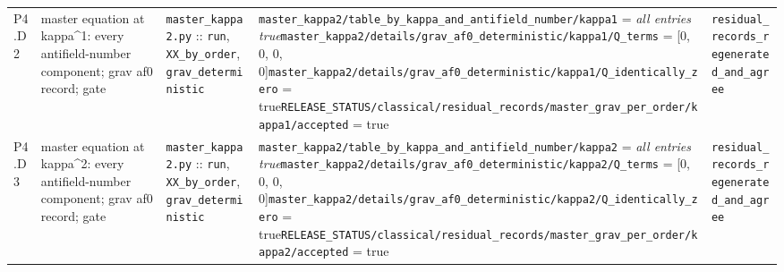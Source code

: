 {\begin{longtable}{@{}p{0.9cm}p{4.1cm}p{3.5cm}p{5.0cm}p{3.0cm}@{}}
P4.D2 & master equation at kappa\^{}1: every antifield-number component; grav af0 record; gate & \texttt{master\_\allowbreak{}kappa2.\allowbreak{}py} :: \texttt{run}, \texttt{XX\_\allowbreak{}by\_\allowbreak{}order}, \texttt{grav\_\allowbreak{}deterministic} & \texttt{master\_\allowbreak{}kappa2/\allowbreak{}table\_\allowbreak{}by\_\allowbreak{}kappa\_\allowbreak{}and\_\allowbreak{}antifield\_\allowbreak{}number/\allowbreak{}kappa1} = \emph{all entries true}\newline \texttt{master\_\allowbreak{}kappa2/\allowbreak{}details/\allowbreak{}grav\_\allowbreak{}af0\_\allowbreak{}deterministic/\allowbreak{}kappa1/\allowbreak{}Q\_\allowbreak{}terms} = [0, 0, 0, 0]\newline \texttt{master\_\allowbreak{}kappa2/\allowbreak{}details/\allowbreak{}grav\_\allowbreak{}af0\_\allowbreak{}deterministic/\allowbreak{}kappa1/\allowbreak{}Q\_\allowbreak{}identically\_\allowbreak{}zero} = true\newline \texttt{RELEASE\_\allowbreak{}STATUS/\allowbreak{}classical/\allowbreak{}residual\_\allowbreak{}records/\allowbreak{}master\_\allowbreak{}grav\_\allowbreak{}per\_\allowbreak{}order/\allowbreak{}kappa1/\allowbreak{}accepted} = true & \texttt{residual\_\allowbreak{}records\_\allowbreak{}regenerated\_\allowbreak{}and\_\allowbreak{}agree} \\
P4.D3 & master equation at kappa\^{}2: every antifield-number component; grav af0 record; gate & \texttt{master\_\allowbreak{}kappa2.\allowbreak{}py} :: \texttt{run}, \texttt{XX\_\allowbreak{}by\_\allowbreak{}order}, \texttt{grav\_\allowbreak{}deterministic} & \texttt{master\_\allowbreak{}kappa2/\allowbreak{}table\_\allowbreak{}by\_\allowbreak{}kappa\_\allowbreak{}and\_\allowbreak{}antifield\_\allowbreak{}number/\allowbreak{}kappa2} = \emph{all entries true}\newline \texttt{master\_\allowbreak{}kappa2/\allowbreak{}details/\allowbreak{}grav\_\allowbreak{}af0\_\allowbreak{}deterministic/\allowbreak{}kappa2/\allowbreak{}Q\_\allowbreak{}terms} = [0, 0, 0, 0]\newline \texttt{master\_\allowbreak{}kappa2/\allowbreak{}details/\allowbreak{}grav\_\allowbreak{}af0\_\allowbreak{}deterministic/\allowbreak{}kappa2/\allowbreak{}Q\_\allowbreak{}identically\_\allowbreak{}zero} = true\newline \texttt{RELEASE\_\allowbreak{}STATUS/\allowbreak{}classical/\allowbreak{}residual\_\allowbreak{}records/\allowbreak{}master\_\allowbreak{}grav\_\allowbreak{}per\_\allowbreak{}order/\allowbreak{}kappa2/\allowbreak{}accepted} = true & \texttt{residual\_\allowbreak{}records\_\allowbreak{}regenerated\_\allowbreak{}and\_\allowbreak{}agree} \\

\end{longtable}}
